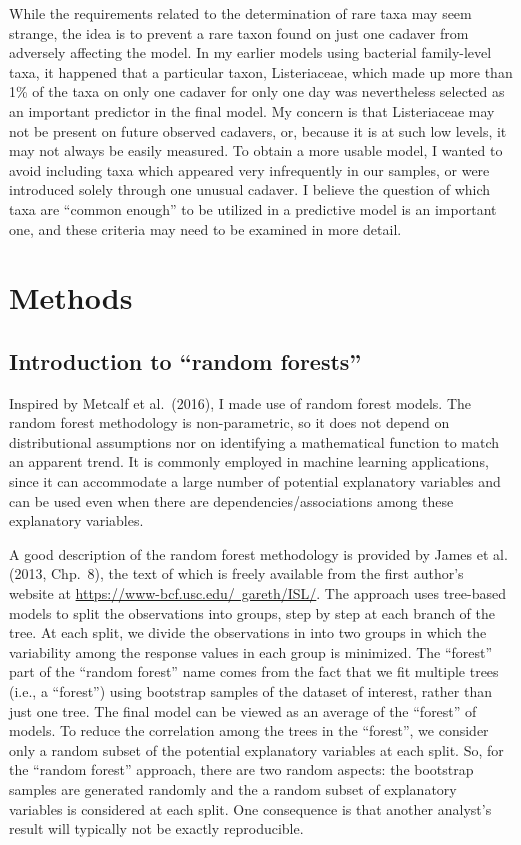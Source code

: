 \documentclass{article}
\begin{document}
While the requirements related to the determination of rare taxa may
seem strange, the idea is to prevent a rare taxon found on just one
cadaver from adversely affecting the model.  In my earlier models
using bacterial family-level taxa, it happened that a particular
taxon, Listeriaceae, which made up more than 1\% of the taxa on only
one cadaver for only one day was nevertheless selected as an important
predictor in the final model.  My concern is that Listeriaceae may not
be present on future observed cadavers, or, because it is at such low
levels, it may not always be easily measured.  To obtain a more usable
model, I wanted to avoid including taxa which appeared very
infrequently in our samples, or were introduced solely through one
unusual cadaver.  I believe the question of which taxa are ``common
enough'' to be utilized in a predictive model is an important one, and
these criteria may need to be examined in more detail.


\section{Methods}

\subsection{Introduction to ``random forests''}

Inspired by Metcalf et al.~(2016), I made use of random forest models.
The random forest methodology is non-parametric, so it does not depend
on distributional assumptions nor on identifying a mathematical
function to match an apparent trend.  It is commonly employed in
machine learning applications, since it can accommodate a large number
of potential explanatory variables and can be used even when there are
dependencies/associations among these explanatory variables.

A good description of the random forest methodology is provided by
James et al. (2013, Chp.~8), the text of which is freely available
from the first author's website at 
\href{https://www-bcf.usc.edu/~gareth/ISL/}{https://www-bcf.usc.edu/~gareth/ISL/}.  The
approach uses tree-based models to split the observations into groups,
step by step at each branch of the tree.  At each split, we divide the
observations in into two groups in which the variability among the
response values in each group is minimized.  The ``forest'' part of
the ``random forest'' name comes from the fact that we fit multiple
trees (i.e., a ``forest'') using bootstrap samples of the dataset of
interest, rather than just one tree.  The final model can be viewed as
an average of the ``forest'' of models.  To reduce the correlation
among the trees in the ``forest'', we consider only a random subset of
the potential explanatory variables at each split.  So, for the
``random forest'' approach, there are two random aspects: the
bootstrap samples are generated randomly and the a random subset of
explanatory variables is considered at each split.  One consequence is
that another analyst's result will typically not be exactly
reproducible.
\end{document}
